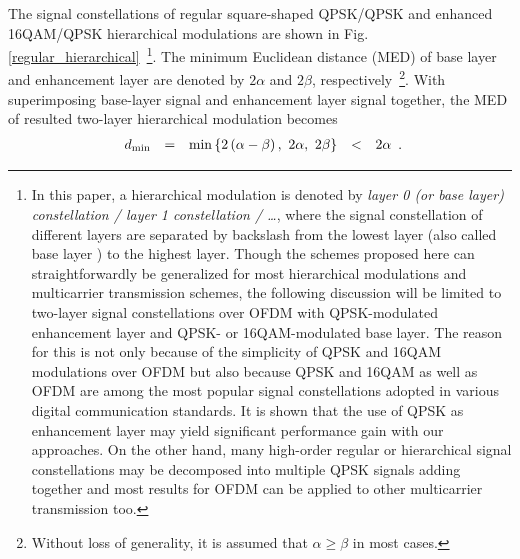 \documentclass[conference]{IEEEtran}
\begin{document}
The signal constellations of regular square-shaped QPSK/QPSK and
enhanced 16QAM/QPSK hierarchical modulations are shown in Fig.
\ref{regular_hierarchical}~\footnote{In this paper, a hierarchical
modulation is denoted by {\em layer 0 (or base layer)
constellation / layer 1 constellation / \ldots}, where the signal
constellation of different layers are separated by backslash from
the lowest layer (also called base layer ) to the highest layer.
Though the schemes proposed here can straightforwardly be
generalized for most hierarchical modulations and multicarrier
transmission schemes, the following discussion will be limited to
two-layer signal constellations over OFDM with QPSK-modulated
enhancement layer and QPSK- or 16QAM-modulated base layer. The
reason for this is not only because of the simplicity of QPSK and
16QAM modulations over OFDM but also because QPSK and 16QAM as
well as OFDM are among the most popular signal constellations
adopted in various digital communication standards. It is shown
that the use of QPSK as enhancement layer may yield significant
performance gain with our approaches. On the other hand, many
high-order regular or hierarchical signal constellations may be
decomposed into multiple QPSK signals adding together and most
results for OFDM can be applied to other multicarrier transmission
too.

}. The minimum Euclidean distance (MED) of base layer and
enhancement layer are denoted by $2\alpha$ and $2\beta$,
respectively~\footnote{Without loss of generality, it is assumed
that $\alpha\geq\beta$ in most cases.}. With superimposing
base-layer signal and enhancement layer signal together, the MED
of resulted two-layer hierarchical modulation becomes
\begin{equation}
\begin{array}{rcccl}
d_{\rm min}& = & \min\left\{2\left(\alpha-\beta\right),\ 2\alpha,\
2\beta\right\}&<& 2\alpha
\end{array}.\label{Regular_MED}
\end{equation}
\begin{figure}
\end{figure}
\end{document}

